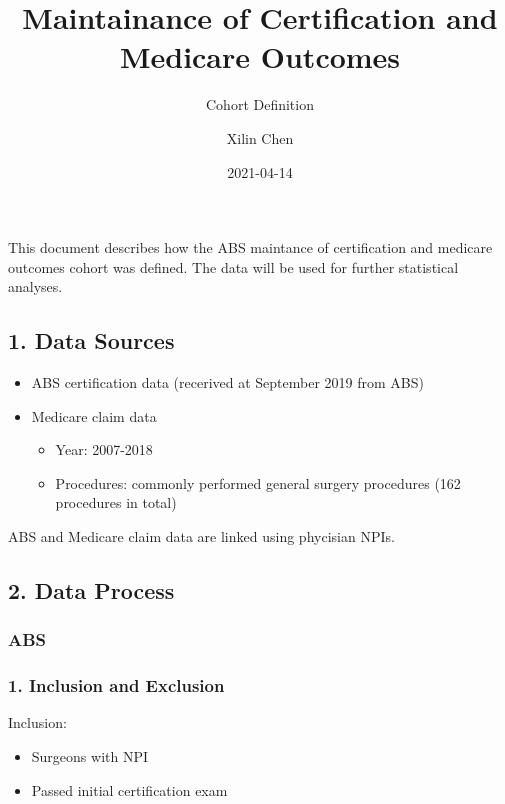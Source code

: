 \documentclass[
]{article}
\title{Maintainance of Certification and Medicare Outcomes}
\subtitle{Cohort Definition}
\author{Xilin Chen}
\date{2021-04-14}
\providecommand{\tightlist}{%
  \setlength{\itemsep}{0pt}\setlength{\parskip}{0pt}}
\begin{document}
\maketitle

{
\setcounter{tocdepth}{3}
\tableofcontents
}
This document describes how the ABS maintance of certification and
medicare outcomes cohort was defined. The data will be used for further
statistical analyses.

\hypertarget{data-sources}{%
\subsection{1. Data Sources}\label{data-sources}}

\begin{itemize}
\tightlist
\item
  ABS certification data (recerived at September 2019 from ABS)
\item
  Medicare claim data

  \begin{itemize}
  \tightlist
  \item
    Year: 2007-2018
  \item
    Procedures: commonly performed general surgery procedures (162
    procedures in total)
  \end{itemize}
\end{itemize}

ABS and Medicare claim data are linked using phycisian NPIs.

\hypertarget{data-process}{%
\subsection{2. Data Process}\label{data-process}}

\hypertarget{abs}{%
\subsubsection{ABS}\label{abs}}

\hypertarget{inclusion-and-exclusion}{%
\subsubsection{1. Inclusion and
Exclusion}\label{inclusion-and-exclusion}}

Inclusion:

\begin{itemize}
\tightlist
\item
  Surgeons with NPI
\item
  Passed initial certification exam
\end{itemize}
\end{document}
